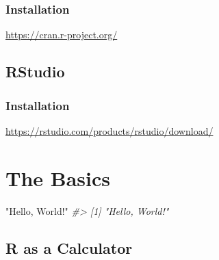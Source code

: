 \documentclass[
]{report}
\newenvironment{Shaded}{\begin{snugshade}}{\end{snugshade}}
\newcommand{\CommentTok}[1]{\textcolor[rgb]{0.56,0.35,0.01}{\textit{#1}}}
\newcommand{\StringTok}[1]{\textcolor[rgb]{0.31,0.60,0.02}{#1}}
\begin{document}
\hypertarget{installation}{%
\subsection{Installation}\label{installation}}

\url{https://cran.r-project.org/}

\hypertarget{rstudio}{%
\section{RStudio}\label{rstudio}}

\hypertarget{installation-1}{%
\subsection{Installation}\label{installation-1}}

\url{https://rstudio.com/products/rstudio/download/}

\hypertarget{the-basics}{%
\chapter{The Basics}\label{the-basics}}

\begin{Shaded}
\begin{Highlighting}[]
\StringTok{"Hello, World!"}
\CommentTok{\#\textgreater{} [1] "Hello, World!"}
\end{Highlighting}
\end{Shaded}

\hypertarget{r-as-a-calculator}{%
\section{R as a Calculator}\label{r-as-a-calculator}}
\end{document}
